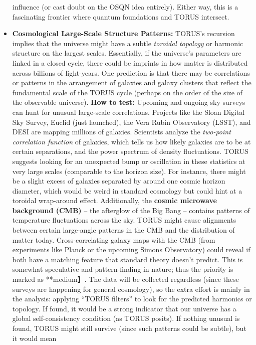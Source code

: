 \documentclass[]{article}
\begin{document}
\begin{itemize}
  influence (or cast doubt on the OSQN idea entirely). Either way, this
  is a fascinating frontier where quantum foundations and TORUS
  intersect.
\item
  \textbf{Cosmological Large-Scale Structure Patterns:} TORUS's
  recursion implies that the universe might have a subtle \emph{toroidal
  topology} or harmonic structure on the largest scales. Essentially, if
  the universe's parameters are linked in a closed cycle, there could be
  imprints in how matter is distributed across billions of light-years.
  One prediction is that there may be correlations or patterns in the
  arrangement of galaxies and galaxy clusters that reflect the
  fundamental scale of the TORUS cycle (perhaps on the order of the size
  of the observable universe). \textbf{How to test:} Upcoming and
  ongoing sky surveys can hunt for unusual large-scale correlations.
  Projects like the Sloan Digital Sky Survey, Euclid (just launched),
  the Vera Rubin Observatory (LSST), and DESI are mapping millions of
  galaxies. Scientists analyze the \emph{two-point correlation function}
  of galaxies, which tells us how likely galaxies are to be at certain
  separations, and the power spectrum of density fluctuations. TORUS
  suggests looking for an unexpected bump or oscillation in these
  statistics at very large scales (comparable to the horizon size)​. For
  instance, there might be a slight excess of galaxies separated by
  around one cosmic horizon diameter, which would be weird in standard
  cosmology but could hint at a toroidal wrap-around effect.
  Additionally, the \textbf{cosmic microwave background (CMB)} -- the
  afterglow of the Big Bang -- contains patterns of temperature
  fluctuations across the sky. TORUS might cause alignments between
  certain large-angle patterns in the CMB and the distribution of matter
  today​. Cross-correlating galaxy maps with the CMB (from experiments
  like Planck or the upcoming Simons Observatory) could reveal if both
  have a matching feature that standard theory doesn't predict​. This is
  somewhat speculative and pattern-finding in nature; thus the priority
  is marked as **medium】. The data will be collected regardless (since
  these surveys are happening for general cosmology), so the extra
  effort is mainly in the analysis: applying ``TORUS filters'' to look
  for the predicted harmonics or topology. If found, it would be a
  strong indicator that our universe has a global self-consistency
  condition (as TORUS posits). If nothing unusual is found, TORUS might
  still survive (since such patterns could be subtle), but it would mean

\end{itemize}
\end{document}
